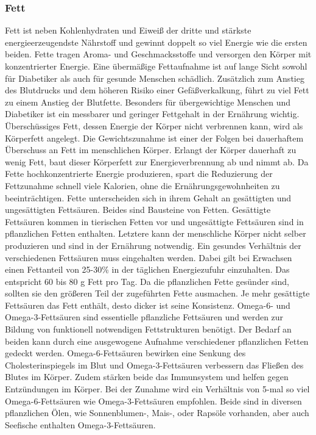 	\subsubsection{Fett}
		Fett ist neben Kohlenhydraten und Eiweiß der dritte und stärkste energieerzeugendste Nährstoff und gewinnt doppelt so viel Energie wie die ersten beiden. Fette tragen Aroma- und Geschmacksstoffe und versorgen den Körper mit konzentrierter Energie. Eine übermäßige Fettaufnahme ist auf lange Sicht sowohl für Diabetiker als auch für gesunde Menschen schädlich. Zusätzlich zum Anstieg des Blutdrucks und dem höheren Risiko einer Gefäßverkalkung, führt zu viel Fett zu einem Anstieg der Blutfette. Besonders für übergewichtige Menschen und Diabetiker ist ein messbarer und geringer Fettgehalt in der Ernährung wichtig. \cite{SG} Überschüssiges Fett, dessen Energie der Körper nicht verbrennen kann, wird als Körperfett angelegt. Die Gewichtszunahme ist einer der Folgen bei dauerhaftem Überschuss an Fett im menschlichen Körper. Erlangt der Körper dauerhaft zu wenig Fett, baut dieser Körperfett zur Energieverbrennung ab und nimmt ab. \cite{ND} Da Fette hochkonzentrierte Energie produzieren, spart die Reduzierung der Fettzunahme schnell viele Kalorien, ohne die Ernährungsgewohnheiten zu beeinträchtigen. \cite{SG}\newline
		Fette unterscheiden sich in ihrem Gehalt an gesättigten und ungesättigten Fettsäuren. Beides sind Bausteine von Fetten. Gesättigte Fettsäuren kommen in tierischen Fetten vor und ungesättigte Fettsäuren sind in pflanzlichen Fetten enthalten. Letztere kann der menschliche Körper nicht selber produzieren und sind in der Ernährung notwendig. Ein gesundes Verhältnis der verschiedenen Fettsäuren muss eingehalten werden. Dabei gilt bei Erwachsen einen Fettanteil von 25-30\% in der täglichen Energiezufuhr einzuhalten. Das entspricht 60 bis 80 g Fett pro Tag. Da die pflanzlichen Fette gesünder sind, sollten sie den größeren Teil der zugeführten Fette ausmachen. Je mehr gesättigte Fettsäuren das Fett enthält, desto dicker ist seine Konsistenz. \newline
		Omega-6- und Omega-3-Fettsäuren sind essentielle pflanzliche Fettsäuren und werden zur Bildung von funktionell notwendigen Fettstrukturen benötigt. Der Bedarf an beiden kann durch eine ausgewogene Aufnahme verschiedener pflanzlichen Fetten gedeckt werden. Omega-6-Fettsäuren bewirken eine Senkung des Cholesterinspiegels im Blut und Omega-3-Fettsäuren verbessern das Fließen des Blutes im Körper. Zudem stärken beide das Immunsystem und helfen gegen Entzündungen im Körper. Bei der Zunahme wird ein Verhältnis von 5-mal so viel Omega-6-Fettsäuren wie Omega-3-Fettsäuren empfohlen. Beide sind in diversen pflanzlichen Ölen, wie Sonnenblumen-, Mais-, oder Rapsöle vorhanden, aber auch Seefische enthalten Omega-3-Fettsäuren. \cite{ND}\newline
